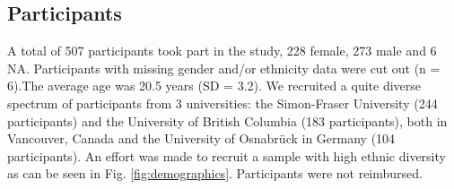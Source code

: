 \documentclass{frontiersSCNS} %
\begin{document}
\subsection{Participants}
A total of 507 participants took part in the study, 228 female, 273 male and 6 NA. Participants with missing gender and/or ethnicity data were cut out (n = 6).The average age was 20.5 years (SD = 3.2). We recruited a quite diverse spectrum of participants from 3 universities: the Simon-Fraser University (244 participants) and the University of British Columbia (183 participants), both in Vancouver, Canada and the University of Osnabr\"uck in Germany (104 participants). An effort was made to recruit a sample with high ethnic diversity as can be seen in Fig. \ref{fig:demographics}. Participants were not reimbursed.
\end{document}
